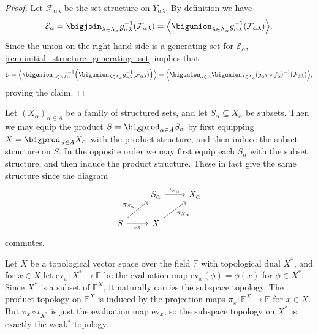 \documentclass[article, a4paper, 11pt, oneside]{memoir}
\numberwithin{equation}{chapter}
\newcommand{\setF}{\mathbb{F}}
\newcommand{\ev}{\mathrm{ev}}
\newcommand{\calE}{\mathcal{E}}
\newcommand{\calF}{\mathcal{F}}
\DeclarePairedDelimiter{\gen}{\langle}{\rangle} %
\newcommand{\preim}{^{-1}}
\begin{document}
\begin{proof}
    Let $\calF_{\alpha\lambda}$ be the set structure on $Y_{\alpha\lambda}$. By definition we have
    \begin{equation*}
        \calE_\alpha
            = \bigjoin_{\lambda \in \Lambda_\alpha} g_{\alpha\lambda}\preim(\calF_{\alpha\lambda})
            = \gen[\Big]{\bigunion_{\lambda \in \Lambda_\alpha} g_{\alpha\lambda}\preim(\calF_{\alpha\lambda})}.
    \end{equation*}
    Since the union on the right-hand side is a generating set for $\calE_\alpha$, \cref{rem:initial_structure_generating_set} implies that
    \begin{equation*}
        \calE
            = \gen[\Big]{\bigunion_{\alpha \in A} f_\alpha\preim \Big( \bigunion_{\lambda \in \Lambda_\alpha} g_{\alpha\lambda}\preim(\calF_{\alpha\lambda}) \Big)}
            = \gen[\Big]{\bigunion_{\alpha \in A} \bigunion_{\lambda \in \Lambda_\alpha} (g_{\alpha\lambda} \circ f_\alpha)\preim(\calF_{\alpha\lambda})},
    \end{equation*}
    proving the claim.
\end{proof}


\begin{examplebreak}
    Let $(X_\alpha)_{\alpha \in A}$ be a family of structured sets, and let $S_\alpha \subseteq X_\alpha$ be subsets. Then we may equip the product $S = \bigprod_{\alpha \in A} S_\alpha$ by first equipping $X = \bigprod_{\alpha \in A} X_\alpha$ with the product structure, and then induce the subset structure on $S$. In the opposite order we may first equip each $S_\alpha$ with the subset structure, and then induce the product structure. These in fact give the same structure since the diagram
    \begin{equation*}
        \begin{tikzcd}
            & S_\alpha
                \ar[r, "\iota_{S_\alpha}"]
            & X_\alpha \\
            S  
                \ar[ur, "\pi_{S_\alpha}"]
                \ar[r, "\iota_S", swap]
            & X
                \ar[ur, "\pi_{X_\alpha}", swap]
        \end{tikzcd}
    \end{equation*}
    commutes.
\end{examplebreak}


\begin{examplebreak}
    Let $X$ be a topological vector space over the field $\setF$ with topological dual $X^*$, and for $x \in X$ let $\ev_x \colon X^* \to \setF$ be the evaluation map $\ev_x(\phi) = \phi(x)$ for $\phi \in X^*$. Since $X^*$ is a subset of $\setF^X$, it naturally carries the subspace topology. The product topology on $\setF^X$ is induced by the projection maps $\pi_x \colon \setF^X \to \setF$ for $x \in X$. But $\pi_x \circ \iota_{X^*}$ is just the evaluation map $\ev_x$, so the subspace topology on $X^*$ is exactly the weak${}^*$-topology.
\end{examplebreak}
\end{document}

